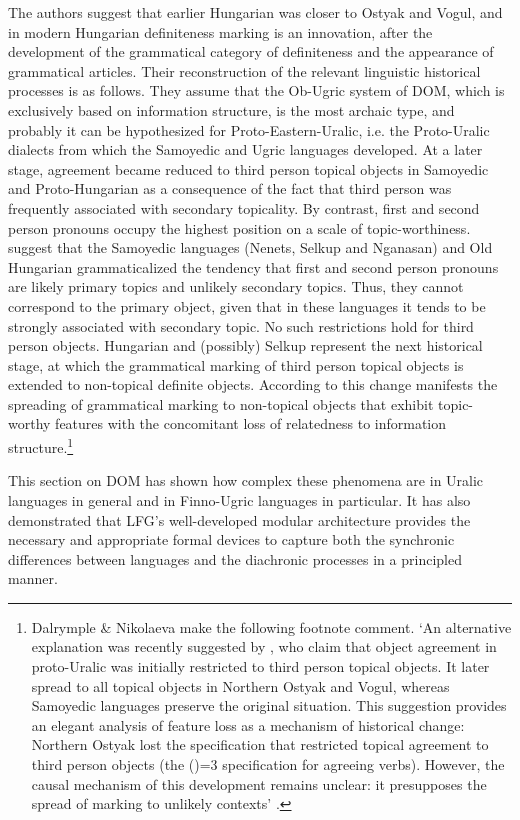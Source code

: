 \documentclass[output=paper,hidelinks]{langscibook}
\begin{document}
The authors suggest that earlier Hungarian was closer to Ostyak and Vogul, and in modern Hungarian definiteness marking is an innovation, after the development of the grammatical category of definiteness and the appearance of grammatical articles. Their reconstruction of the relevant linguistic historical processes is as follows. They assume that the Ob-Ugric system of DOM, which is exclusively based on information structure, is the most archaic type, and probably it can be hypothesized for Proto-Eastern-Uralic, i.e. the Proto-Uralic dialects from which the Samoyedic and Ugric languages developed. At a later stage, agreement became reduced to third person topical objects in Samoyedic and Proto-Hungarian as a consequence of the fact that third person was frequently associated with secondary topicality. By contrast, first and second person pronouns occupy the highest position on a scale of topic-worthiness. \citet{DN} suggest that the Samoyedic languages (Nenets, Selkup and Nganasan) and Old Hungarian grammaticalized the tendency that first and second person pronouns are likely primary topics and unlikely secondary topics. Thus, they cannot correspond to the primary object, given that in these languages it tends to be strongly associated with secondary topic. No such restrictions hold for third person objects. Hungarian and (possibly) Selkup represent the next historical stage, at which the grammatical marking of third person topical objects is extended to non-topical definite objects. According to \citet{DN} this change manifests the spreading of grammatical marking to non-topical objects that exhibit topic-worthy features with the concomitant loss of relatedness to information structure.\footnote{Dalrymple \& Nikolaeva make the following footnote comment. `An alternative explanation was recently suggested by \citet{CoppockWechsler2010}, who claim that object agreement in proto-Uralic was initially restricted to third person topical objects. It later spread to all topical objects in Northern Ostyak and Vogul, whereas Samoyedic languages preserve the original situation. This suggestion provides an elegant analysis of feature loss as a mechanism of historical change: Northern Ostyak lost the specification that restricted topical agreement to third person objects (the (\UP\OBJ\PERS)=3 specification for agreeing verbs). However, the causal mechanism of this development remains unclear: it presupposes the spread of marking to unlikely contexts' \citep[201]{DN}.}

This section on DOM has shown how complex these phenomena are in Uralic languages in general and in Finno-Ugric languages in particular. It has also dem\-on\-strated that LFG's well-developed modular architecture provides the necessary and appropriate formal devices to capture both the synchronic differences between languages and the diachronic processes in a principled manner.
\end{document}
